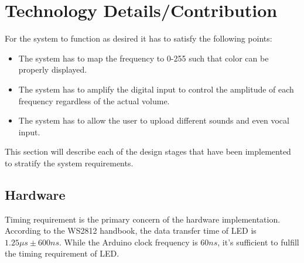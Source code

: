 \documentclass[12pt,a4paper,journal]{IEEEtran}
\begin{document}
\section{Technology Details/Contribution}
For the system to function as desired it has to satisfy the following points:
\begin{itemize}
\item The system has to map the frequency to 0-255 such that color can be properly displayed.
\item The system has to amplify the digital input to control the amplitude of each frequency regardless of the actual volume.
\item The system has to allow the user to upload different sounds and even vocal input.
\end{itemize}
This section will describe each of the design stages that have been implemented to stratify the system requirements. 
\renewcommand{\thesubsection}{\thesection.\Alph{subsection}}
\subsection{Hardware}
Timing requirement is the primary concern of the hardware implementation. According to the WS2812 handbook, the data transfer time of LED is $1.25\mu s \pm 600ns$. While the Arduino clock frequency is $60ns$, it's sufficient to fulfill the timing requirement of LED.
\end{document}
